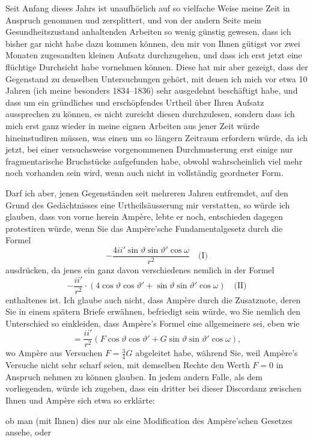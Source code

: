 \documentclass[fontsize=10pt,paper=a5,pagesize=auto]{scrbook}
\newcommand{\origpage}[1]{\marginpar{\footnotesize\textit{S. #1}}}
\begin{document}
Seit Anfang dieses Jahrs ist unaufhörlich auf so vielfache Weise meine Zeit in Anspruch genommen und zersplittert, und von der andern Seite mein Gesundheitszustand anhaltenden Arbeiten so wenig günstig gewesen, dass ich bisher gar nicht habe dazu kommen können, den mir von Ihnen gütigst vor zwei Monaten zugesandten kleinen Aufsatz durchzugehen, und dass ich erst jetzt eine flüchtige Durchsicht habe vornehmen können. Diese hat mir aber gezeigt, dass der Gegenstand zu denselben Untersuchungen gehört, mit denen ich mich vor etwa 10 Jahren (ich meine besonders 1834--1836) sehr ausgedehnt beschäftigt habe, und dass um ein gründliches und erschöpfendes Urtheil über Ihren Aufsatz aussprechen zu können, es nicht zureicht diesen durchzulesen, sondern dass ich mich erst ganz wieder in meine eignen Arbeiten aus jener Zeit würde hineinstudiren müssen, was einen um so längern Zeitraum erfordern würde, da ich jetzt, bei einer versuchsweise vorgenommenen Durchmusterung erst einige nur fragmentarische Bruchstücke aufgefunden habe, obwohl wahrscheinlich viel mehr noch vorhanden sein wird, wenn auch nicht in vollständig geordneter Form.

Darf ich aber, jenen Gegenständen seit mehreren Jahren entfremdet, auf den Grund des Gedächtnisses eine Urtheilsäusserung mir verstatten, so würde ich glauben, dass von vorne herein Ampère, lebte er noch, entschieden dagegen protestiren würde, wenn Sie das Ampère'sche Fundamentalgesetz durch die Formel
\[
-\frac{4ii' \sin\vartheta \sin\vartheta' \cos\omega}{r^2} \quad \text{(I)}
\]
ausdrücken, da jenes ein ganz davon verschiedenes nemlich in der Formel
\[
-\frac{ii'}{r^2} \cdot (4\cos\vartheta \cos\vartheta' + \sin\vartheta \sin\vartheta' \cos\omega) \quad \text{(II)}
\]
enthaltenes ist. Ich glaube auch nicht, dass Ampère durch die Zusatznote, deren Sie in einem spätern Briefe erwähnen, befriedigt sein würde, wo Sie nemlich den Unterschied so einkleiden, dass Ampère's Formel eine allgemeinere sei, eben wie
\[
= \frac{ii'}{r^2}(F\cos\vartheta \cos\vartheta' + G\sin\vartheta \sin\vartheta' \cos\omega),
\]
wo Ampère aus Versuchen $F = \tfrac{3}{4}G$ abgeleitet habe, während Sie, weil Ampère's Versuche nicht sehr scharf seien, mit demselben Rechte den Werth $F = 0$ in Anspruch nehmen zu können glauben. In jedem andern Falle, als dem vorliegenden, würde ich zugeben, dass ein dritter bei dieser Discordanz zwischen Ihnen und Ampère sich etwa so erklärte:

\origpage{634}
ob man (mit Ihnen) dies nur als eine Modification des Ampère'schen Gesetzes ansehe, oder
\end{document}
